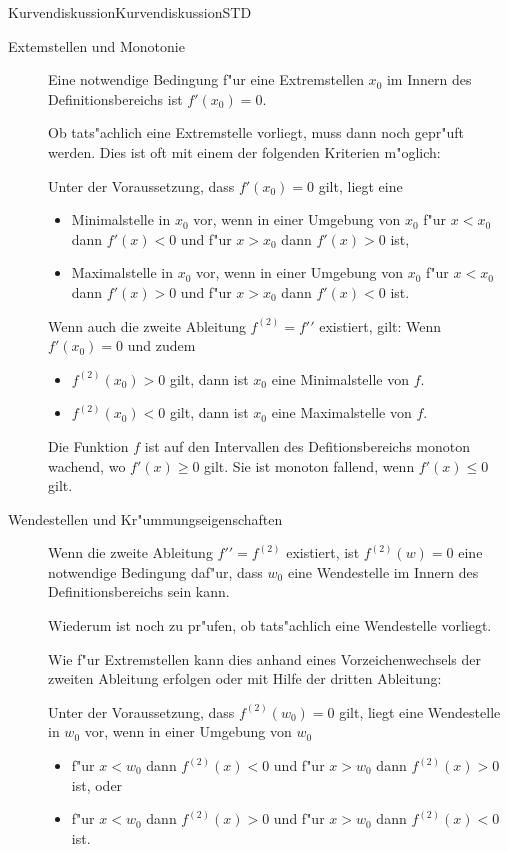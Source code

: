 \begin{MXContent}{Kurvendiskussion}{Kurvendiskussion}{STD}
\begin{description}
\item[Extemstellen und Monotonie]
Eine notwendige Bedingung f"ur eine Extremstellen $x_0$ im Innern des 
Definitionsbereichs ist $f'(x_0) = 0$.

Ob tats"achlich eine Extremstelle vorliegt, muss dann noch gepr"uft werden.
Dies ist oft mit einem der folgenden Kriterien m"oglich:

Unter der Voraussetzung, dass $f'(x_0) = 0$ gilt, liegt eine
\begin{itemize}
\item Minimalstelle in $x_0$ vor, wenn in einer Umgebung von $x_0$ f"ur $x < x_0$ 
dann $f'(x) < 0$ und f"ur $x > x_0$ dann $f'(x) > 0$ ist,
\item Maximalstelle in $x_0$ vor, wenn in einer Umgebung von $x_0$ f"ur $x < x_0$ 
dann $f'(x) > 0$ und f"ur $x > x_0$ dann $f'(x) < 0$ ist.
\end{itemize}

Wenn auch die zweite Ableitung $f^{(2)} = {f'}'$ existiert, gilt:
Wenn $f'(x_0) = 0$ und zudem 
\begin{itemize}
\item $f^{(2)}(x_0) > 0$ gilt, dann ist $x_0$ eine Minimalstelle von $f$.

\item $f^{(2)}(x_0) < 0$ gilt, dann ist $x_0$ eine Maximalstelle von $f$.
\end{itemize}
Die Funktion $f$ ist auf den Intervallen des Defitionsbereichs monoton
wachend, wo $f'(x) \geq 0$ gilt. Sie ist monoton fallend, wenn $f'(x) \leq 0$ 
gilt.

\item[Wendestellen und Kr"ummungseigenschaften]
Wenn die zweite Ableitung ${f'}' = f^{(2)}$ existiert, ist $f^{(2)}(w) = 0$
eine notwendige Bedingung daf"ur, dass $w_0$ eine Wendestelle im Innern des 
Definitionsbereichs sein kann.

Wiederum ist noch zu pr"ufen, ob tats"achlich eine Wendestelle vorliegt.

Wie f"ur Extremstellen kann dies anhand eines Vorzeichenwechsels der zweiten
Ableitung erfolgen oder mit Hilfe der dritten Ableitung:

Unter der Voraussetzung, dass $f^{(2)}(w_0) = 0$ gilt, liegt eine
Wendestelle in $w_0$ vor, wenn in einer Umgebung von $w_0$
\begin{itemize}
\item f"ur $x < w_0$ dann $f^{(2)}(x) < 0$ und f"ur $x > w_0$ dann 
$f^{(2)}(x) > 0$ ist, oder
\item f"ur $x < w_0$ dann $f^{(2)}(x) > 0$ und f"ur $x > w_0$ dann 
$f^{(2)}(x) < 0$ ist.
\end{itemize}


\end{description}
\end{MXContent}

